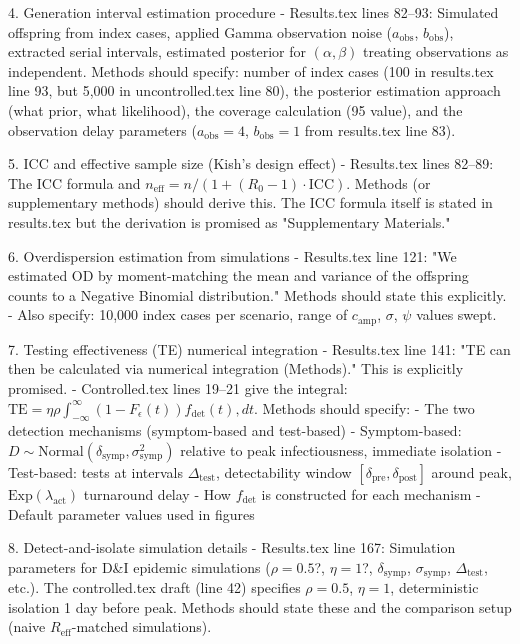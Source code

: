   4. Generation interval estimation procedure
  - Results.tex lines 82–93: Simulated offspring from index cases, applied Gamma observation noise
  ($a_\text{obs}$, $b_\text{obs}$), extracted serial intervals, estimated posterior for $(\alpha,
  \beta)$ treating observations as independent. Methods should specify: number of index cases (100 in
   results.tex line 93, but 5,000 in uncontrolled.tex line 80), the posterior estimation approach
  (what prior, what likelihood), the coverage calculation (95%
  value), and the observation delay parameters ($a_\text{obs} = 4$, $b_\text{obs} = 1$ from
  results.tex line 83).

  5. ICC and effective sample size (Kish's design effect)
  - Results.tex lines 82–89: The ICC formula and $n_\text{eff} = n / (1 + (R_0 - 1) \cdot
  \text{ICC})$. Methods (or supplementary methods) should derive this. The ICC formula itself is
  stated in results.tex but the derivation is promised as "Supplementary Materials."

  6. Overdispersion estimation from simulations
  - Results.tex line 121: "We estimated OD by moment-matching the mean and variance of the offspring
  counts to a Negative Binomial distribution." Methods should state this explicitly.
  - Also specify: 10,000 index cases per scenario, range of $c_\text{amp}$, $\sigma$, $\psi$ values
  swept.

  7. Testing effectiveness (TE) numerical integration
  - Results.tex line 141: "TE can then be calculated via numerical integration (Methods)." This is
  explicitly promised.
  - Controlled.tex lines 19–21 give the integral: $\text{TE} = \eta \rho \int_{-\infty}^\infty (1 -
  F_\epsilon(t)) f_\text{det}(t) , dt$. Methods should specify:
    - The two detection mechanisms (symptom-based and test-based)
    - Symptom-based: $D \sim \text{Normal}(\delta_\text{symp}, \sigma_\text{symp}^2)$ relative to
  peak infectiousness, immediate isolation
    - Test-based: tests at intervals $\Delta_\text{test}$, detectability window $[\delta_\text{pre},
  \delta_\text{post}]$ around peak, $\text{Exp}(\lambda_\text{act})$ turnaround delay
    - How $f_\text{det}$ is constructed for each mechanism
    - Default parameter values used in figures

  8. Detect-and-isolate simulation details
  - Results.tex line 167: Simulation parameters for D&I epidemic simulations ($\rho = 0.5$?, $\eta =
  1$?, $\delta_\text{symp}$, $\sigma_\text{symp}$, $\Delta_\text{test}$, etc.). The controlled.tex
  draft (line 42) specifies $\rho = 0.5$, $\eta = 1$, deterministic isolation 1 day before peak.
  Methods should state these and the comparison setup (naive $R_\text{eff}$-matched simulations).

